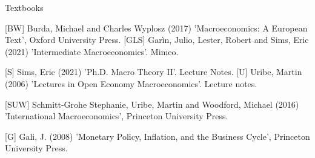\documentclass{beamer}
\newenvironment{literatur}{%
  \parskip2pt \parindent0pt \raggedright
  \def\lititem{\hangindent=0.5cm \hangafter1}}{%
  \par\ignorespaces}
\begin{document}
\begin{frame}{Textbooks}


\begin{literatur}
\small

\lititem [BW] Burda, Michael and Charles Wyplosz (2017) 'Macroeconomics: A European Text', Oxford University Press.
\vfill
\lititem [GLS] Gar\`{i}n, Julio, Lester, Robert and Sims, Eric (2021) 'Intermediate Macroeconomics'. Mimeo. %

\vfill
\lititem [S] Sims, Eric (2021) 'Ph.D. Macro Theory II'. Lecture Notes. %
\vfill
\lititem [U] Uribe, Martin (2006) 'Lectures in Open Economy Macroeconomics'. Lecture notes.

\vfill
\lititem [SUW] Schmitt-Grohe Stephanie, Uribe, Martin and Woodford, Michael (2016) 'International Macroeconomics', Princeton University Press.

\vfill
\lititem [G] Gali, J. (2008) 'Monetary Policy, Inflation, and the Business Cycle', Princeton University Press.

  
\end{literatur}



\end{frame}
\end{document}
